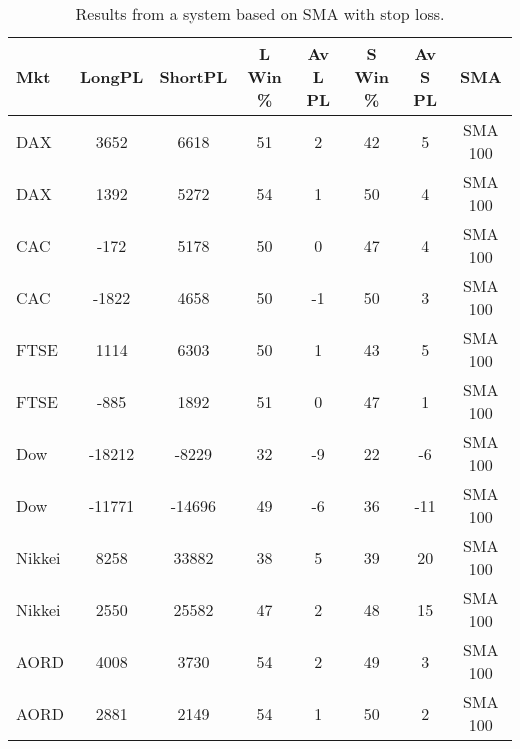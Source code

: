\begin{table}[ht]
\centering
\caption[Results from a system based on SMA with stop loss]{Results from a system based on SMA with stop loss.} 
\label{tab:sma_results_Sloss}
\begin{tabular}{lccccccc}
  \toprule Mkt & LongPL & ShortPL & L Win \% & Av L PL & S Win \% & Av S PL & SMA \\ 
  \midrule DAX & 3652 & 6618 & 51 & 2 & 42 & 5 & SMA 100 \\ 
  DAX & 1392 & 5272 & 54 & 1 & 50 & 4 & SMA 100 \\ 
  CAC & -172 & 5178 & 50 & 0 & 47 & 4 & SMA 100 \\ 
  CAC & -1822 & 4658 & 50 & -1 & 50 & 3 & SMA 100 \\ 
  FTSE & 1114 & 6303 & 50 & 1 & 43 & 5 & SMA 100 \\ 
  FTSE & -885 & 1892 & 51 & 0 & 47 & 1 & SMA 100 \\ 
  Dow & -18212 & -8229 & 32 & -9 & 22 & -6 & SMA 100 \\ 
  Dow & -11771 & -14696 & 49 & -6 & 36 & -11 & SMA 100 \\ 
  Nikkei & 8258 & 33882 & 38 & 5 & 39 & 20 & SMA 100 \\ 
  Nikkei & 2550 & 25582 & 47 & 2 & 48 & 15 & SMA 100 \\ 
  AORD & 4008 & 3730 & 54 & 2 & 49 & 3 & SMA 100 \\ 
  AORD & 2881 & 2149 & 54 & 1 & 50 & 2 & SMA 100 \\ 
   \bottomrule \end{tabular}
\end{table}
